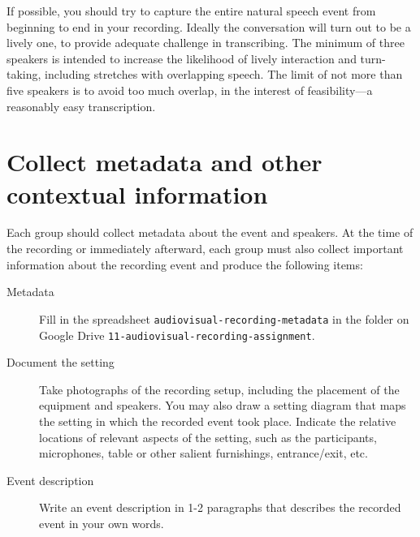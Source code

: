 \documentclass{article}
\begin{document}
\noindent If possible, you should try to capture the entire natural speech event from beginning to end in your recording. Ideally the conversation will turn out to be a lively one, to provide adequate challenge in transcribing. The minimum of three speakers is intended to increase the likelihood of lively interaction and turn-taking, including stretches with overlapping speech. The limit of not more than five speakers is to avoid too much overlap, in the interest of feasibility---a reasonably easy transcription.\\

\section{Collect metadata and other contextual information}

Each group should collect metadata about the event and speakers. At the time of the recording or immediately afterward, each group must also collect important information about the recording event and produce the following items:

\begin{description}
  \item[Metadata] Fill in the spreadsheet \texttt{audiovisual-recording-metadata} in the folder on Google Drive \texttt{11\--audiovisual\--recording\--assignment}.
  \item[Document the setting] Take photographs of the recording setup, including the placement of the equipment and speakers. You may also draw a setting diagram that maps the setting in which the recorded event took place. Indicate the relative locations of relevant aspects of the setting, such as the participants, microphones, table or other salient furnishings, entrance/exit, etc. 
  \item[Event description] Write an event description in 1-2 paragraphs that describes the recorded event in your own words.
\end{description}


\end{document}
